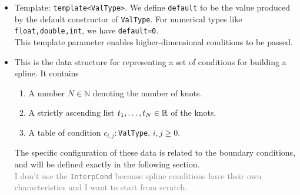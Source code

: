 \documentclass[12pt]{article}
\begin{document}
    \begin{itemize}
        \item Template: \texttt{template<ValType>}. We define \texttt{default} to be the value produced by the 
              default constructor of \texttt{ValType}. For numerical types like \texttt{float,double,int}, we have
              \texttt{default=0}. \\
              This template parameter enables higher-dimensional conditions to be passed.
        \item This is the data structure for representing a set of conditions for building a spline. It contains
              \begin{enumerate}
                  \item A number \(N\in \mathbb N\) denoting the number of knots.
                  \item A strictly ascending list \(t_1,\dots,t_N\in \mathbb {R}\) of the knots.
                  \item A table of condition \(c_{i,j}:\)\texttt{ValType}, \(i,j\ge 0\).
              \end{enumerate}
              The specific configuration of these data is related to the boundary conditions, and will be defined 
              exactly in the following section. \\
              \textcolor{gray}{I don't use the \texttt{InterpCond} because spline conditions have their own characteristics and I want to start from scratch.}


\end{itemize}
\end{document}
